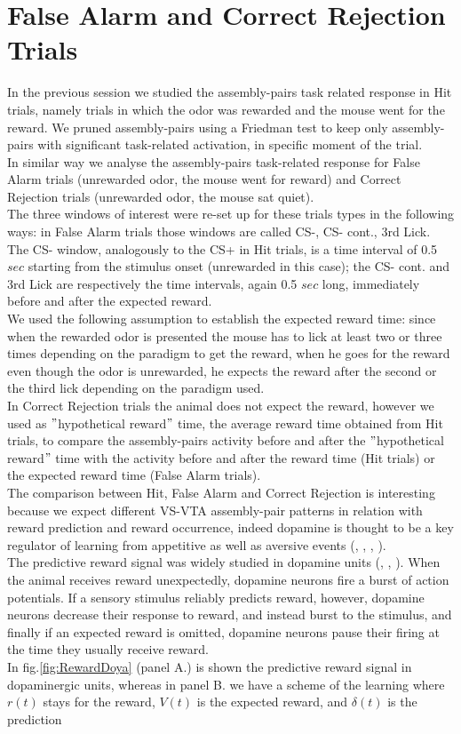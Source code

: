 \section{False Alarm and Correct Rejection Trials}
In the previous session we studied the assembly-pairs task related response in Hit trials, namely trials in which the odor was rewarded and the mouse went for the reward. We pruned assembly-pairs using a Friedman test to keep only assembly-pairs with significant task-related activation, in specific moment of the trial.\\In similar way we analyse the assembly-pairs task-related response for False Alarm trials (unrewarded odor, the mouse went for reward) and Correct Rejection trials (unrewarded odor, the mouse sat quiet).\\The three windows of interest were re-set up for these trials types in the following ways: in False Alarm trials those windows are called CS-, CS- cont., 3rd Lick. The CS- window, analogously to the CS+ in Hit trials, is a time interval of 0.5 $sec$ starting from the stimulus onset (unrewarded in this case); the CS- cont. and 3rd Lick are respectively the time intervals, again 0.5 $sec$ long, immediately before and after the expected reward.\\We used the following assumption to establish the expected reward time: since when the rewarded odor is presented the mouse has to lick at least two or three times depending on the paradigm to get the reward, when he goes for the reward even though the odor is unrewarded, he expects the reward after the second or the third lick depending on the paradigm used.\\In Correct Rejection trials the animal does not expect the reward, however we used as $"$hypothetical reward$"$ time, the average reward time obtained from Hit trials, to compare the assembly-pairs activity before and after the $"$hypothetical reward$"$ time with the activity before and after the reward time (Hit trials) or the expected reward time (False Alarm trials).\\The comparison between Hit, False Alarm and Correct Rejection is interesting because we expect different VS-VTA assembly-pair patterns in relation with reward prediction and reward occurrence, indeed dopamine is thought to be a key regulator of learning from appetitive as well as aversive events (\cite{Schultz1997}, \cite{Wenzel}, \cite{Fiorillo2013}, \cite{Schultz2015}).\\The predictive reward signal was widely studied in dopamine units (\cite{Schultz1998}, \cite{Schultz2001}, \cite{Doya}). When the animal receives reward unexpectedly, dopamine neurons fire a burst of action potentials. If a sensory stimulus reliably predicts reward, however, dopamine neurons decrease their response to reward, and instead burst to the stimulus, and finally if an expected reward is omitted, dopamine neurons pause their firing at the time they usually receive reward.\\In fig.\ref{fig:RewardDoya} (panel A.) is shown the predictive reward signal in dopaminergic units, whereas in panel B. we have a scheme of the learning where $r(t)$ stays for the reward, $V(t)$ is the expected reward, and $\delta(t)$ is the prediction 